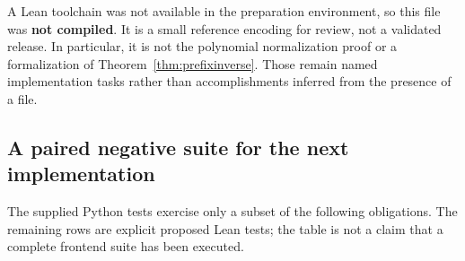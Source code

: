 \documentclass[11pt,a4paper]{article}
\newcommand{\code}[1]{\texttt{\detokenize{#1}}}
\theoremstyle{plain}
\theoremstyle{definition}
\begin{document}
A Lean toolchain was not available in the preparation environment, so this file was \textbf{not compiled}. It is a small reference encoding for review, not a validated release. In particular, it is not the polynomial normalization proof or a formalization of Theorem~\ref{thm:prefixinverse}. Those remain named implementation tasks rather than accomplishments inferred from the presence of a \code{.lean} file.

\subsection{A paired negative suite for the next implementation}
The supplied Python tests exercise only a subset of the following obligations. The remaining rows are explicit proposed Lean tests; the table is not a claim that a complete frontend suite has been executed.
\end{document}
